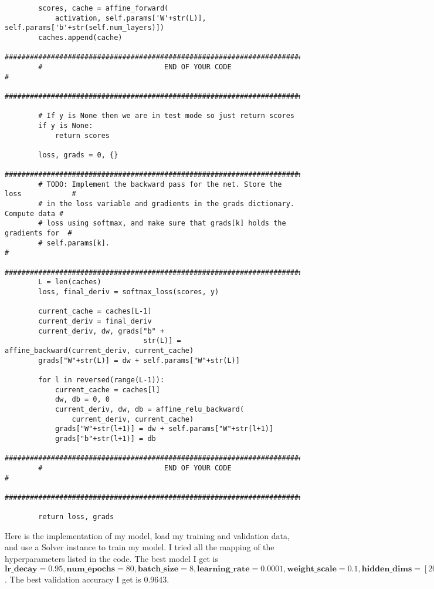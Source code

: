 \documentclass[a4paper,12pt]{article}
\begin{document}
\begin{lstlisting}
        scores, cache = affine_forward(
            activation, self.params['W'+str(L)], self.params['b'+str(self.num_layers)])
        caches.append(cache)
        ############################################################################
        #                             END OF YOUR CODE                             #
        ############################################################################

        # If y is None then we are in test mode so just return scores
        if y is None:
            return scores

        loss, grads = 0, {}
        ############################################################################
        # TODO: Implement the backward pass for the net. Store the loss            #
        # in the loss variable and gradients in the grads dictionary. Compute data #
        # loss using softmax, and make sure that grads[k] holds the gradients for  #
        # self.params[k].                                                          #
        ############################################################################
        L = len(caches)
        loss, final_deriv = softmax_loss(scores, y)

        current_cache = caches[L-1]
        current_deriv = final_deriv
        current_deriv, dw, grads["b" +
                                 str(L)] = affine_backward(current_deriv, current_cache)
        grads["W"+str(L)] = dw + self.params["W"+str(L)]

        for l in reversed(range(L-1)):
            current_cache = caches[l]
            dw, db = 0, 0
            current_deriv, dw, db = affine_relu_backward(
                current_deriv, current_cache)
            grads["W"+str(l+1)] = dw + self.params["W"+str(l+1)]
            grads["b"+str(l+1)] = db
        ############################################################################
        #                             END OF YOUR CODE                             #
        ############################################################################

        return loss, grads

\end{lstlisting}

\clearpage
Here is the implementation of my model, load my training and validation data, and use a Solver instance to train my model. I tried all the mapping of the hyperparameters listed in the code. The best model I get is  $\textbf{lr\_decay}=0.95, \textbf{num\_epochs} = 80, \textbf{batch\_size} = 8, \textbf{learning\_rate} = 0.0001, \textbf{weight\_scale} = 0.1, \textbf{hidden\_dims} = [200]$. The best validation accuracy I get is 0.9643.
\end{document}
